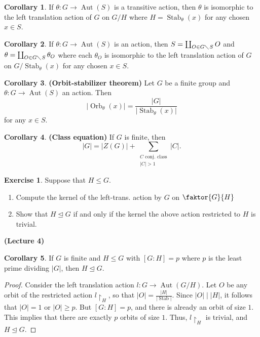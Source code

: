\documentclass[10pt,letterpaper,cm]{nupset}
\theoremstyle{definition}
\newtheorem{corollary}{Corollary}
\newtheorem{exercise}{Exercise}
\newcommand{\1}{\mathbf{1}}
\newcommand{\0}{\vec 0}
\DeclareMathOperator{\aut}{Aut}
\DeclareMathOperator{\stab}{Stab}
\DeclareMathOperator{\orb}{Orb}
\begin{document}
\begin{corollary}
If $\theta : G \to \aut(S)$ is a transitive action, then $\theta$ is isomorphic to the left translation action of $G$ on $G/H$ where $H = \stab_{\theta}(x)$ for any chosen $x\in S$.
\end{corollary}

\begin{corollary}
If $\theta : G \to \aut(S)$ is an action, then $S = \coprod_{O \in G\diagdown S} O$ and $\theta = \coprod_{O \in G \diagdown S} \theta_O$ where each $\theta_O$ is isomorphic to the left translation action of $G$ on $G/\stab_{\theta}(x)$ for any chosen $x\in S$. 
\end{corollary}

\begin{corollary}{\textbf{(Orbit-stabilizer theorem)}}
Let $G$ be a finite group and $\theta : G \to \aut(S)$ an action. Then $$ \lvert{\orb_{\theta}(x)}\rvert = \frac{|G|}{\lvert{\stab_{\theta}(x)}\rvert}     $$ for any $x\in S$. 
\end{corollary}

\begin{corollary}{\textbf{(Class equation)}}
If $G$ is finite, then $$|G| = |Z(G)| + \sum_{{\substack{C \text{ conj. class} \\ |C| >1}}} |C|     .$$
\end{corollary}

\begin{exercise}{Suppose that $H \leq G$.}
\begin{enumerate}
\item Compute the kernel of the left-trans. action by $G$ on $\faktor{G}{H}$
\item Show that $H \unlhd G$  if and only if the kernel the above action restricted to $H$ is trivial. 
\end{enumerate}
\end{exercise}

\begin{center}
{\textbf{(Lecture 4)}} 
\end{center}

\begin{corollary} If $G$ is finite and $H\leq G$ with $[G:H] =p$ where $p$ is the least prime dividing $|G|$, then $H\unlhd G$.
\end{corollary}
\begin{proof}
Consider the left translation action $l : G \to \aut(G/H)$. Let $O$ be any orbit of the restricted action $l\restriction_H$, so that $|O| = \frac{|H|}{\lvert{\stab}\rvert}$. Since $|O| \mid |H|$, it follows that $|O|=1$ or $|O| \geq p$. But $[G:H] = p$, and there is already an orbit of size $1$. This implies that there are exactly $p$ orbits of size $1$. Thus, $l\restriction_H$ is trivial, and $H \unlhd G$.
\end{proof}
\end{document}
